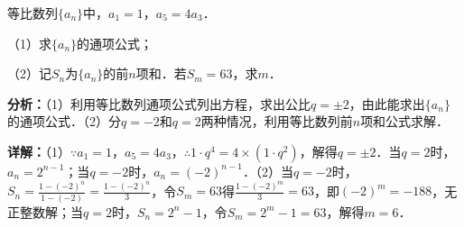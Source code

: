 \begin{question}[points=12]
等比数列$\{a_n\}$中，$a_1=1$，$a_5=4a_3$．

（1）求$\{a_n\}$的通项公式；

（2）记$S_n$为$\{a_n\}$的前$n$项和．若$S_m=63$，求$m$．
\begin{solution}

\textbf{分析：}（1）利用等比数列通项公式列出方程，求出公比$q=\pm2$，由此能求出$\{a_n\}$的通项公式．（2）分$q=-2$和$q=2$两种情况，利用等比数列前$n$项和公式求解．

\textbf{详解：}（1）$\because a_1=1$，$a_5=4a_3$，$\therefore 1\cdot q^4=4\times(1\cdot q^2)$，解得$q=\pm2$．当$q=2$时，$a_n=2^{n-1}$；当$q=-2$时，$a_n=(-2)^{n-1}$．（2）当$q=-2$时，$S_n=\frac{1-(-2)^n}{1-(-2)}=\frac{1-(-2)^n}{3}$，令$S_m=63$得$\frac{1-(-2)^m}{3}=63$，即$(-2)^m=-188$，无正整数解；当$q=2$时，$S_n=2^n-1$，令$S_m=2^m-1=63$，解得$m=6$．
\end{solution}
\end{question}


